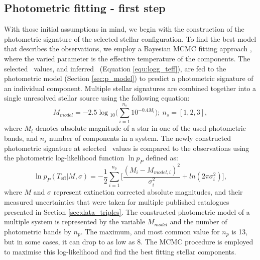 \subsection{Photometric fitting - first step}
\label{sec:photo_fit}
With those initial assumptions in mind, we begin with the construction of the photometric signature of the selected stellar configuration. To find the best model that describes the observations, we employ a Bayesian MCMC fitting approach \cite{2013PASP..125..306F}, where the varied parameter is the effective temperature of the components. The selected \Teff\ values, and inferred \Logg\ (Equation \ref{equ:logg_teff}), are fed to the photometric model (Section \ref{sec:p_model}) to predict a photometric signature of an individual component. Multiple stellar signatures are combined together into a single unresolved stellar source using the following equation:
\begin{equation}
	M_{model} = -2.5 \log{}_{10} \Big( \sum_{i=1}^{n_s} 10^{-0.4 M_i} \Big); \ n_s=[1, 2, 3],
\end{equation}
where $M_i$ denotes absolute magnitude of a star in one of the used photometric bands, and $n_s$ number of components in a system. The newly constructed photometric signature at selected \Teff\ values is compared to the observations using the photometric log-likelihood function $\ln p_{P}$ defined as:
\begin{equation}
	\label{equ:lnp_p}
	\ln p_{P}(T_\mathrm{eff} | M, \sigma) = -\frac{1}{2} \sum_{i=1}^{n_p} \Big[ \frac{(M_i - M_{model, i})^2}{\sigma_i^2} +ln(2\pi\sigma_i^2) \Big],
\end{equation}
where $M$ and $\sigma$ represent extinction corrected absolute magnitudes, and their measured uncertainties that were taken for multiple published catalogues presented in Section \ref{sec:data_triples}. The constructed photometric model of a multiple system is represented by the variable $M_{model}$ and the number of photometric bands by $n_p$. The maximum, and most common value for $n_p$ is 13, but in some cases, it can drop to as low as 8. The MCMC procedure is employed to maximise this log-likelihood and find the best fitting stellar components.

